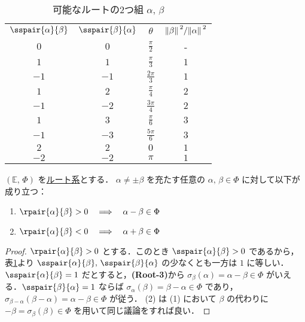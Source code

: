 \documentclass[rep_main]{subfiles}
\begin{document}
\begin{table}[H]
	\centering
	\caption[]{可能なルートの2つ組 $\alpha,\, \beta$}
	\label{tab:rootsystem}
	\begin{tabular}{cc|cc}
		\multicolumn{1}{c}{$\sspair{\alpha}{\beta}$} 
		&\multicolumn{1}{c}{$\sspair{\beta}{\alpha}$} 
		&\multicolumn{1}{|c}{$\theta$} 
		&\multicolumn{1}{c}{$\norm*{\beta}^2/\norm*{\alpha}^2$} \\
		\hhline{--|--}
		$0 $ &$0 $ &$\frac{\pi}{2}$ 	&- \\
		$1 $ &$1 $ &$\frac{\pi}{3}$ 	&$1$ \\
		$-1$ &$-1$ &$\frac{2\pi}{3}$ 	&$1$ \\
		$1 $ &$2 $ &$\frac{\pi}{4}$ 	&$2$ \\
		$-1$ &$-2$ &$\frac{3\pi}{4}$ 	&$2$ \\
		$1 $ &$3 $ &$\frac{\pi}{6}$ 	&$3$ \\
		$-1$ &$-3$ &$\frac{5\pi}{6}$ 	&$3$ \\
		$2 $ &$2 $ &$0$ 				&$1$ \\
		$-2$ &$-2$ &$\pi$ 				&$1$ \\
	\end{tabular}
\end{table}%

\begin{mylem}[label=lem:root-basic]{}
	$(\mathbb{E},\, \Phi)$ を\hyperref[ax:root-system]{ルート系}とする．
	$\alpha \neq \pm \beta$ を充たす任意の $\alpha,\, \beta \in \Phi$ に対して以下が成り立つ：
	\begin{enumerate}
		\item $\rpair{\alpha}{\beta} > 0 \IMP \alpha - \beta \in \Phi$
		\item $\rpair{\alpha}{\beta} < 0 \IMP \alpha + \beta \in \Phi$
	\end{enumerate}
\end{mylem}

\begin{proof}
	$\rpair{\alpha}{\beta} > 0$ とする．このとき $\sspair{\alpha}{\beta} > 0$ であるから，表\ref{tab:rootsystem}より $\sspair{\alpha}{\beta},\, \sspair{\beta}{\alpha}$ の少なくとも一方は $1$ に等しい．$\sspair{\alpha}{\beta} = 1$ だとすると，\textsf{\textbf{(Root-3)}}から $\sigma_\beta(\alpha) = \alpha - \beta \in \Phi$ がいえる．$\sspair{\beta}{\alpha} = 1$ ならば $\sigma_\alpha(\beta) = \beta - \alpha \in \Phi$ であり，$\sigma_{\beta-\alpha}(\beta-\alpha) = \alpha - \beta \in \Phi$ が従う．
	(2) は (1) において $\beta$ の代わりに $-\beta = \sigma_\beta(\beta) \in \Phi$ を用いて同じ議論をすれば良い．
\end{proof}
\end{document}
